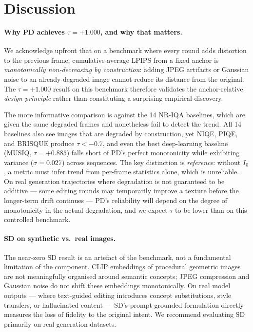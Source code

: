 \documentclass[sigconf]{acmart}
\newcommand{\Izero}{\ensuremath{I_0}}
\begin{document}
\section{Discussion}
\label{sec:discussion}

\paragraph{Why PD achieves $\tau = +1.000$, and why that matters.}
We acknowledge upfront that on a benchmark where every round adds
distortion to the previous frame, cumulative-average LPIPS from a fixed
anchor is \emph{monotonically non-decreasing by construction}: adding
JPEG artifacts or Gaussian noise to an already-degraded image cannot
reduce its distance from the original.
The $\tau = +1.000$ result on this benchmark therefore validates the
anchor-relative \emph{design principle} rather than constituting a
surprising empirical discovery.

The more informative comparison is against the 14 NR-IQA baselines,
which are given the same degraded frames and nonetheless fail to detect
the trend.
All 14 baselines also see images that are degraded by construction, yet
NIQE, PIQE, and BRISQUE produce $\tau < -0.7$, and even the best
deep-learning baseline (MUSIQ, $\tau = +0.885$) falls short of PD's
perfect monotonicity while exhibiting variance ($\sigma = 0.027$) across
sequences.
The key distinction is \emph{reference}: without $\Izero$, a metric must
infer trend from per-frame statistics alone, which is unreliable.
On real generation trajectories where degradation is not guaranteed to be
additive --- some editing rounds may temporarily improve a texture before
the longer-term drift continues --- PD's reliability will depend on the
degree of monotonicity in the actual degradation, and we expect $\tau$ to
be lower than on this controlled benchmark.

\paragraph{SD on synthetic vs.\ real images.}
The near-zero SD result is an artefact of the benchmark, not a
fundamental limitation of the component.
CLIP embeddings of procedural geometric images are not meaningfully
organised around semantic concepts; JPEG compression and Gaussian
noise do not shift these embeddings monotonically.
On real model outputs --- where text-guided editing introduces concept
substitutions, style transfers, or hallucinated content --- SD's
prompt-grounded formulation directly measures the loss of fidelity to
the original intent.
We recommend evaluating SD primarily on real generation datasets.
\end{document}
